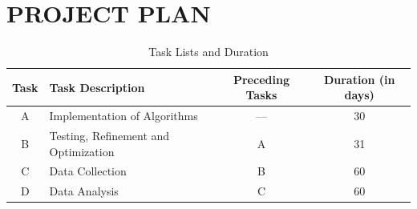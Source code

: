 \documentclass{strrespaper-trad}
\begin{document}
	\literaturecited

	\appendix

	\chapter{PROJECT PLAN}
		\begin{table}[htbp]
			\centering
			\caption{Task Lists and Duration}
			\label{tab:task_lists_duration}
			\begin{tabularx}{\linewidth}{cXcc}
				\toprule
				Task & Task Description                     & Preceding Tasks & Duration (in days) \\
				\midrule
				A    & Implementation of Algorithms         & ---             & 30                 \\
				B    & Testing, Refinement and Optimization & A               & 31                 \\
				C    & Data Collection                      & B               & 60                 \\
				D    & Data Analysis                        & C               & 60                 \\
				\bottomrule
			\end{tabularx}
		\end{table}
\end{document}
